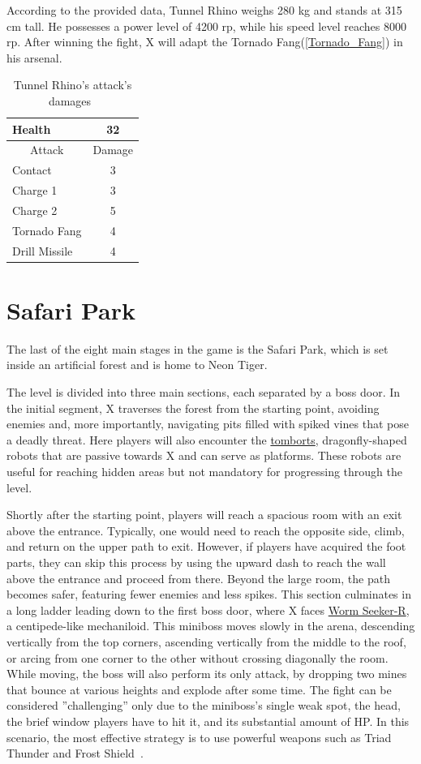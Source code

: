 According to the provided data, Tunnel Rhino weighs 280 kg and stands at 315 cm tall. He possesses a power level of 4200 rp, while his speed level reaches 8000 rp. After winning the fight, X will adapt the Tornado Fang(\ref{Tornado_Fang}) in his arsenal.

\begin{table}[htp]
	\centering
	\begin{tabular}[h]{l c}
		\toprule
		Health  & 32\\
		\midrule
		\multicolumn{1}{c}{Attack} & \multicolumn{1}{c}{Damage}\\
		Contact & 3\\
		Charge 1& 3\\
		Charge 2& 5\\
		Tornado Fang& 4\\
		Drill Missile & 4\\
		\bottomrule
	\end{tabular}
	\caption{Tunnel Rhino's attack's damages~\cite{wiki:Tunnel_rhino,book:Compendium}}
\end{table} 


\section{Safari Park}
The last of the eight main stages in the game is the Safari Park, which is set inside an artificial forest and is home to Neon Tiger.

The level is divided into three main sections, each separated by a boss door. In the initial segment, X traverses the forest from the starting point, avoiding enemies and, more importantly, navigating pits filled with spiked vines that pose a deadly threat. Here players will also encounter the \hyperlink{enem:Tombort}{tomborts}, dragonfly-shaped robots that are passive towards X and can serve as platforms. These robots are useful for reaching hidden areas but not mandatory for progressing through the level.

Shortly after the starting point, players will reach a spacious room with an exit above the entrance. Typically, one would need to reach the opposite side, climb, and return on the upper path to exit. However, if players have acquired the foot parts, they can skip this process by using the upward dash to reach the wall above the entrance and proceed from there. Beyond the large room, the path becomes safer, featuring fewer enemies and less spikes. This section culminates in a long ladder leading down to the first boss door, where X faces \hyperlink{miniboss:Worm_seeker-r}{Worm Seeker-R}, a centipede-like mechaniloid. This miniboss moves slowly in the arena, descending vertically from the top corners, ascending vertically from the middle to the roof, or arcing from one corner to the other without crossing diagonally the room. While moving, the boss will also perform its only attack, by dropping two mines that bounce at various heights and explode after some time. The fight can be considered ''challenging'' only due to the miniboss's single weak spot, the head, the brief window players have to hit it, and its substantial amount of HP. In this scenario, the most effective strategy is to use powerful weapons such as Triad Thunder and Frost Shield~\cite{wiki:Worm_seeker}.

